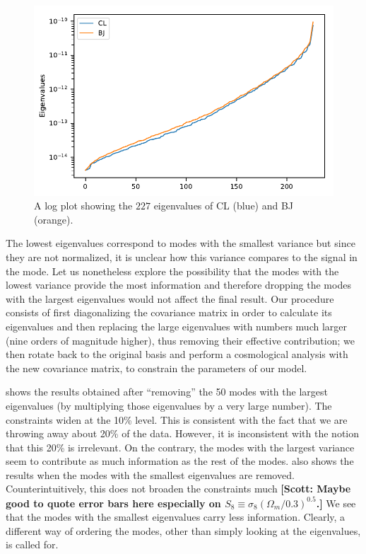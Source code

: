 \documentclass[twocolumn]{\docclass}
\newcommand\scott[1]{{\bf [Scott: #1]}}
\begin{document}
	\begin{figure}
		\includegraphics[width=0.9\columnwidth]{Eigenvalues/Eigenvalues_Y3_BJ-CL.pdf}
		\caption{A log plot showing the $227$ eigenvalues of CL (blue) and BJ (orange). \label{fig:coveigen}}
	\end{figure}


	
	The lowest eigenvalues correspond to modes with the smallest variance but since they are not normalized, it is unclear how this variance compares to the signal in the mode. Let us nonetheless explore the possibility that the modes with the lowest variance provide the most information and therefore dropping the modes with the largest eigenvalues would not affect the final result.
Our procedure consists of first diagonalizing the covariance matrix in order to calculate its eigenvalues and then replacing the large eigenvalues with numbers much larger (nine orders of magnitude higher), thus removing their effective contribution; we then rotate back to the original basis and perform a cosmological analysis with the new covariance matrix, to constrain the parameters of our model. 
	
	
  shows the results obtained after ``removing'' the 50 modes with the largest eigenvalues (by multiplying those eigenvalues by a very large number). The constraints widen at the 10\% level. This is consistent with the fact that we are throwing away about 20\% of the data. However, it is inconsistent with the notion that this 20\% is irrelevant. On the contrary, the modes with the largest variance seem to contribute as much information as the rest of the modes.   also shows the results when the modes with the smallest eigenvalues are removed. Counterintuitively, this does not broaden the constraints much \scott{Maybe good to quote error bars here especially on $S_8\equiv \sigma_8 (\Omega_m/0.3)^{0.5}$.} We see that the modes with the smallest eigenvalues carry less information. Clearly, a different way of ordering the modes, other than simply looking at the eigenvalues, is called for.
 
\end{document}
